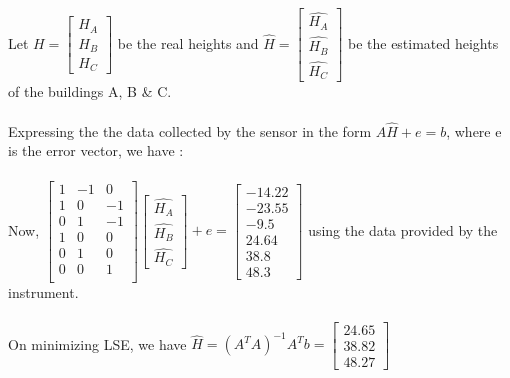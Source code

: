 \documentclass[a4paper,fleqn,11pt]{article}
\theoremstyle{mytheor}
\begin{document}
\section{}
Let $H = \begin{bmatrix}
		 H_{A} \\
		 H_{B} \\
		 H_{C}
		 \end{bmatrix}$ be the real heights and $\hat{H} = \begin{bmatrix}
															 \hat{H_{A}} \\
															 \hat{H_{B}} \\
															 \hat{H_{C}}
															 \end{bmatrix}$
be the estimated heights of the buildings A, B \& C. \\ \\
Expressing the the data collected by the sensor in the form $A\hat{H} + e = b$, where e is the error vector, we have : \\ \\
Now, $\begin{bmatrix}
	  1  & -1 & 0  \\
	  1  & 0  & -1 \\
	  0  & 1  & -1 \\
	  1  & 0  & 0  \\
	  0  & 1  & 0  \\
	  0  & 0  & 1  \\
	  \end{bmatrix}
	  \begin{bmatrix}
	  \hat{H_{A}} \\
	  \hat{H_{B}} \\
	  \hat{H_{C}}
	  \end{bmatrix} + e
	  =
	  \begin{bmatrix}
	  -14.22 \\
	  -23.55 \\
	  -9.5   \\
	  24.64  \\
	  38.8   \\
	  48.3
	  \end{bmatrix}$ using the data provided by the instrument. \\ \\

On minimizing LSE, we have $\hat{H} = (A^T A)^{-1} A^T b = \begin{bmatrix}
															 24.65 \\
															 38.82 \\
															 48.27
															 \end{bmatrix}$ \begin{flushright}
\end{flushright}
\end{document}
